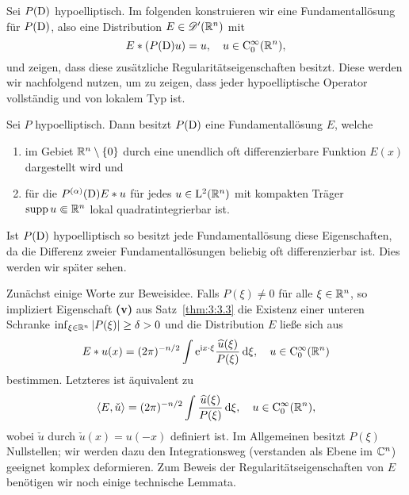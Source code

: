 Sei $P(\mathrm D)$ hypoelliptisch. Im folgenden konstruieren wir eine Fundamentallösung für $P(\mathrm D)$, also eine Distribution $E\in\mathscr D'(\mathbb R^n)$ mit
\begin{equation}
E*(P(\mathrm D) u) = u, \quad u \in \mathrm C_0^\infty(\mathbb R^n),
\end{equation}
und zeigen, dass diese zusätzliche Regularitätseigenschaften besitzt. Diese werden wir nachfolgend nutzen, um zu zeigen, dass jeder hypoelliptische Operator vollständig und von lokalem Typ ist. 
\begin{thm}\label{fundamental_exist}
Sei $P$ hypoelliptisch. Dann besitzt $P(\mathrm D)$ eine Fundamentallösung $E$, welche 
\begin{enumerate}
\item im Gebiet $\mathbb R^n\setminus\{0\}$  durch eine unendlich oft differenzierbare Funktion $E(x)$ dargestellt wird und
\item für die $P^{(\alpha)}(\mathrm D) E*u$ für jedes $u\in \mathrm L^2(\mathbb R^n)$ mit kompakten Träger $\operatorname{supp} u\Subset\mathbb R^n$ lokal quadratintegrierbar ist. 
\end{enumerate}
\end{thm}
\begin{rem}
Ist $P(\mathrm D)$ hypoelliptisch so besitzt jede Fundamentallösung diese Eigenschaften, da die Differenz zweier Fundamentallösungen beliebig oft differenzierbar ist. Dies werden wir später sehen.
\end{rem}

Zunächst einige Worte zur Beweisidee.  Falls $P(\xi)\neq 0$ für alle $\xi\in \mathbb R^n$, so impliziert  Eigenschaft {\bf (v)} aus Satz~\ref{thm:3:3.3}  die Existenz einer unteren Schranke
$\inf_{\xi\in\mathbb R^n} |P(\xi)|\ge\delta>0$ und die Distribution $E$ ließe sich aus
\begin{equation}\label{distr1}
E*u(x) = (2\pi)^{-n/2}\int \mathrm e^{\mathrm i x\cdot \xi} \frac{\widehat u(\xi)}{P(\xi)}\,\mathrm d \xi, \quad u \in \mathrm C_0^\infty(\mathbb R^n)
\end{equation}
bestimmen. Letzteres ist  äquivalent zu
\begin{equation}\label{distr2}
\langle E,\check u\rangle = (2\pi)^{-n/2} \int \frac{\widehat u(\xi)}{P(\xi)}\,\mathrm d \xi, \quad u \in\mathrm C_0^\infty(\mathbb R^n),
\end{equation}
wobei $\check u$ durch $\check u(x)=u(-x)$ definiert ist. Im Allgemeinen besitzt $P(\xi)$ Nullstellen; wir werden dazu den Integrationsweg (verstanden als Ebene im $\mathbb C^n$) geeignet komplex deformieren. Zum Beweis der Regularitätseigenschaften von $E$ benötigen wir noch einige technische Lemmata.

